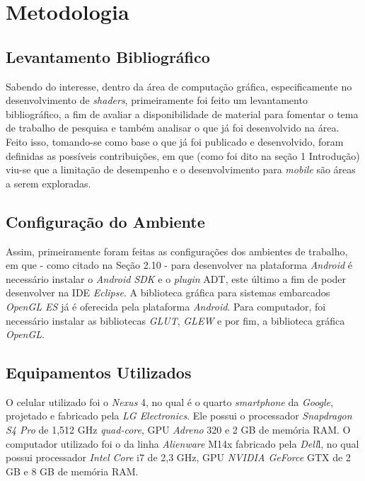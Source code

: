 \chapter[Metodologia]{Metodologia}

\section{Levantamento Bibliográfico}

Sabendo do interesse, dentro da área de computação gráfica, especificamente no desenvolvimento de  \textit{shaders}, primeiramente foi feito um levantamento bibliográfico, a fim de avaliar a disponibilidade de material para fomentar o tema de trabalho de pesquisa e também analisar o que já foi desenvolvido na área. Feito isso, tomando-se como base o que já foi publicado e desenvolvido, foram definidas as possíveis contribuições, em que (como foi dito na seção 1 Introdução) viu-se que a limitação de desempenho e o desenvolvimento para \textit{mobile} são áreas a serem exploradas.  

\section{Configuração do Ambiente}
	
Assim, primeiramente foram feitas as configurações dos ambientes de trabalho, em que -  como citado na Seção 2.10  -  para desenvolver na plataforma \textit{Android} é necessário instalar o \textit{Android SDK} e o \textit{plugin} ADT, este último a fim de poder desenvolver na IDE \textit{Eclipse}. A biblioteca gráfica para sistemas embarcados \textit{OpenGL ES} já é oferecida pela plataforma \textit{Android}. Para computador, foi necessário instalar as bibliotecas \textit{GLUT}, \textit{GLEW} e por fim, a biblioteca gráfica \textit{OpenGL}.

\section{Equipamentos Utilizados}

O celular utilizado foi o \textit{Nexus} 4, no qual é o quarto  \textit{smartphone} da  \textit{Google}, projetado e fabricado pela \textit{LG Electronics}.  Ele possui o processador \textit{Snapdragon S4 Pro} de 1,512 GHz \textit{quad-core}, GPU \textit{Adreno} 320 e 2 GB de memória RAM. O computador utilizado foi o da linha \textit{Alienware} M14x fabricado pela \textit{Dell}l, no qual possui processador \textit{Intel Core} i7 de 2,3 GHz, GPU \textit{NVIDIA GeForce} GTX de 2 GB e 8 GB de memória RAM. 

